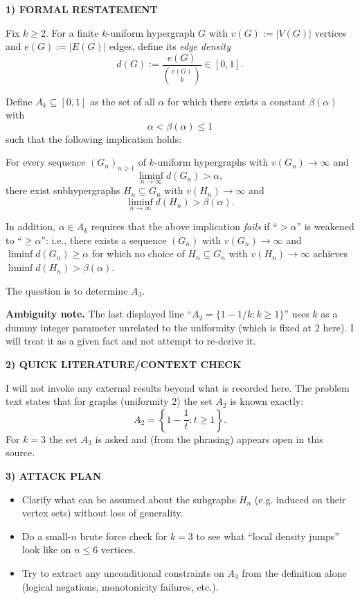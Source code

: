 \medskip
\noindent\textbf{1) FORMAL RESTATEMENT}

Fix $k\ge 2$.
For a finite $k$-uniform hypergraph $G$ with $v(G):=|V(G)|$ vertices and $e(G):=|E(G)|$ edges, define its \emph{edge density}
\[
d(G):=\frac{e(G)}{\binom{v(G)}{k}}\in[0,1].
\]

Define $A_k\subseteq[0,1]$ as the set of all $\alpha$ for which there exists a constant $\beta(\alpha)$ with
\[
\alpha<\beta(\alpha)\le 1
\]
such that the following implication holds:

\quad For every sequence $(G_n)_{n\ge 1}$ of $k$-uniform hypergraphs with $v(G_n)\to\infty$ and
\[
\liminf_{n\to\infty} d(G_n) > \alpha,
\]
there exist subhypergraphs $H_n\subseteq G_n$ with $v(H_n)\to\infty$ and
\[
\liminf_{n\to\infty} d(H_n) > \beta(\alpha).
\]

In addition, $\alpha\in A_k$ requires that the above implication \emph{fails} if ``$>\alpha$'' is weakened to ``$\ge\alpha$'': i.e., there exists a sequence $(G_n)$ with $v(G_n)\to\infty$ and $\liminf d(G_n)\ge \alpha$ for which no choice of $H_n\subseteq G_n$ with $v(H_n)\to\infty$ achieves $\liminf d(H_n)>\beta(\alpha)$.

The question is to determine $A_3$.

\textbf{Ambiguity note.} The last displayed line ``$A_2=\{1-1/k:k\ge 1\}$'' uses $k$ as a dummy integer parameter unrelated to the uniformity (which is fixed at 2 here). I will treat it as a given fact and not attempt to re-derive it.

\medskip
\noindent\textbf{2) QUICK LITERATURE/CONTEXT CHECK}

I will not invoke any external results beyond what is recorded here.
The problem text states that for graphs (uniformity 2) the set $A_2$ is known exactly:
\[
A_2 = \left\{ 1-\frac{1}{t} : t\geq 1\right\}.
\]
For $k=3$ the set $A_3$ is asked and (from the phrasing) appears open in this source.

\medskip
\noindent\textbf{3) ATTACK PLAN}

\begin{itemize}
\item Clarify what can be assumed about the subgraphs $H_n$ (e.g. induced on their vertex sets) without loss of generality.
\item Do a small-$n$ brute force check for $k=3$ to see what ``local density jumps'' look like on $n\le 6$ vertices.
\item Try to extract any unconditional constraints on $A_3$ from the definition alone (logical negations, monotonicity failures, etc.).
\end{itemize}

